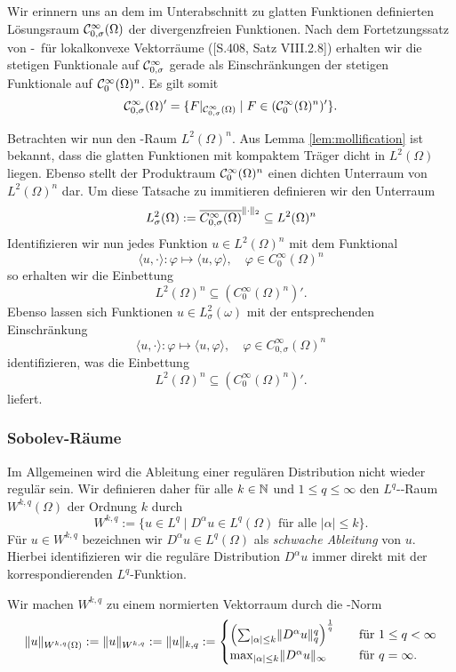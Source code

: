 Wir erinnern uns an dem im Unterabschnitt zu glatten Funktionen definierten Lösungsraum $\mathcal{C}_{0, \sigma}^\infty(\Omega)$ der divergenzfreien Funktionen.
Nach dem Fortetzungssatz von \hahn\hyp{}\banach\ für lokalkonvexe Vektorräume (\cite{werner2011fa}[S.408, Satz VIII.2.8]) erhalten wir die stetigen Funktionale auf $\mathcal{C}_{0,\sigma}^\infty$ gerade als Einschränkungen der stetigen Funktionale auf $\mathcal{C}_0^\infty(\Omega)^n$. Es gilt somit
$$
\mathcal{C}_{0,\sigma}^\infty(\Omega)' = \{F|_{\mathcal{C}_{0,\sigma}^\infty(\Omega)} \mid F \in (\mathcal{C}_0^\infty(\Omega)^n)'\}.
$$

Betrachten wir nun den \hilbert\hyp{}Raum $L^2(\Omega)^n$.
Aus Lemma \ref{lem:mollification} ist bekannt, dass die glatten Funktionen mit kompaktem Träger dicht in $L^2(\Omega)$ liegen. 
Ebenso stellt der Produktraum $\mathcal{C}_0^\infty(\Omega)^n$ einen dichten Unterraum von $L^2(\Omega)^n$ dar.
Um diese Tatsache zu immitieren definieren wir den Unterraum 
$$
  L^2_\sigma(\Omega) 
  := \overline{C_{0,\sigma}^\infty(\Omega)}^{\lVert \cdot \rVert_2}
  \subseteq L^2(\Omega)^n
$$
Identifizieren wir nun jedes Funktion $u \in L^2(\Omega)^n$ mit dem Funktional
$$
\langle u, \cdot \rangle \colon \varphi \mapsto \langle u, \varphi \rangle, \quad \varphi \in C_0^\infty(\Omega)^n
$$
so erhalten wir die Einbettung 
$$
  L^2(\Omega)^n \subseteq (C_0^\infty(\Omega)^n)'.
$$
Ebenso lassen sich Funktionen $u \in L^2_\sigma(\omega)$ mit der entsprechenden Einschränkung
$$
\langle u, \cdot \rangle \colon \varphi \mapsto \langle u, \varphi \rangle, \quad \varphi \in C_{0,\sigma}^\infty(\Omega)^n
$$
identifizieren, was die Einbettung
$$
  L^2(\Omega)^n \subseteq (C_0^\infty(\Omega)^n)'.
$$
liefert.

\subsubsection{Sobolev-Räume}

Im Allgemeinen wird die Ableitung einer regulären Distribution nicht wieder regulär sein.
Wir definieren daher für alle $k \in \mathbb{N}$ und $1 \leq q \leq \infty$ den $L^q$\hyp{}\sobolev\hyp{}Raum $W^{k,q}(\Omega)$ der Ordnung $k$ durch
$$
W^{k,q} := \{ u \in L^q \mid D^\alpha u \in L^q(\Omega) \text{ für alle } |\alpha| \leq k\}.
$$
Für $u \in W^{k,q}$ bezeichnen wir $D^\alpha u \in L^q(\Omega)$ als \emph{schwache Ableitung} von $u$.
Hierbei identifizieren wir die reguläre Distribution $D^\alpha u$ immer direkt mit der korrespondierenden $L^q$\hyp{}Funktion.

Wir machen $W^{k,q}$ zu einem normierten Vektorraum durch die \sobolev\hyp{}Norm
$$
  \lVert u \rVert_{W^{k,q}(\Omega)} 
  := \lVert u \rVert_{W^{k,q}} 
  := \lVert u \rVert_{k,q} 
  := \begin{cases} 
    \left(\sum_{|\alpha| \leq k} \lVert D^\alpha u \rVert_q^q \right)^\frac{1}{q}\quad&\text{für } 1 \leq q < \infty \\
    \max_{|\alpha| \leq k} \lVert D^\alpha u \rVert_\infty \quad&\text{für }q = \infty.
    \end{cases}
$$

